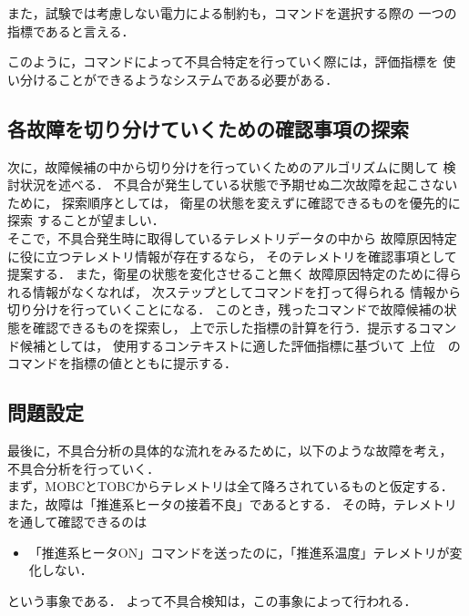 \documentclass[11pt]{article}
\begin{document}
また，試験では考慮しない電力による制約も，コマンドを選択する際の
一つの指標であると言える．

このように，コマンドによって不具合特定を行っていく際には，評価指標を
使い分けることができるようなシステムである必要がある．


\subsection{各故障を切り分けていくための確認事項の探索}
次に，故障候補の中から切り分けを行っていくためのアルゴリズムに関して
検討状況を述べる．
不具合が発生している状態で予期せぬ二次故障を起こさないために，
探索順序としては，
衛星の状態を変えずに確認できるものを優先的に探索
することが望ましい．\\ 
そこで，不具合発生時に取得しているテレメトリデータの中から
故障原因特定に役に立つテレメトリ情報が存在するなら，
そのテレメトリを確認事項として提案する．
また，衛星の状態を変化させること無く
故障原因特定のために得られる情報がなくなれば，
次ステップとしてコマンドを打って得られる
情報から切り分けを行っていくことになる．
このとき，残ったコマンドで故障候補の状態を確認できるものを探索し，
上で示した指標の計算を行う．提示するコマンド候補としては，
使用するコンテキストに適した評価指標に基づいて
上位　のコマンドを指標の値とともに提示する．

\subsection{問題設定}
最後に，不具合分析の具体的な流れをみるために，以下のような故障を考え，
不具合分析を行っていく．\\
まず，MOBCとTOBCからテレメトリは全て降ろされているものと仮定する．
また，故障は「推進系ヒータの接着不良」であるとする．
その時，テレメトリを通して確認できるのは
\begin{itemize}
   \item 「推進系ヒータON」コマンドを送ったのに，「推進系温度」テレメトリが変化しない．
\end{itemize}
という事象である．
よって不具合検知は，この事象によって行われる．
\end{document}
